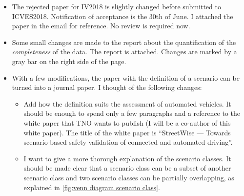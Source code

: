 \documentclass[10pt,final,a4paper,oneside,onecolumn]{article}
\newlength\venncircle\setlength{\venncircle}{10em}
\begin{document}
\begin{itemize}
	\item The rejected paper for IV2018 is slightly changed before submitted to ICVES2018. Notification of acceptance is the 30th of June. I attached the paper in the email for reference. No review is required now.
	
	\item Some small changes are made to the report about the quantification of the \emph{completeness} of the data. The report is attached. Changes are marked by a gray bar on the right side of the page.
	
	\item With a few modifications, the paper with the definition of a scenario can be turned into a journal paper. I thought of the following changes:
	\begin{itemize}
		\item Add how the definition suits the assessment of automated vehicles. It should be enough to spend only a few paragraphs and a reference to the white paper that TNO wants to publish (I will be a co-author of this white paper). The title of the white paper is ``StreetWise --- Towards scenario-based safety validation of connected and automated driving''.		
		\item I want to give a more thorough explanation of the scenario classes. It should be made clear that a scenario class can be a subset of another scenario class and two scenario classes can be partially overlapping, as explained in \cref{fig:venn diagram scenario class}.
		\begin{figure}
			\centering
\end{figure}
\end{itemize}
\end{itemize}
\end{document}
